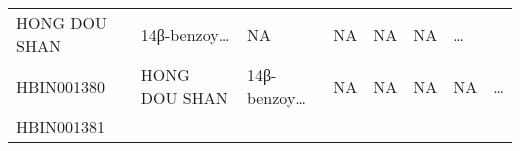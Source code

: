 \documentclass[
]{article}
\begin{document}
\begin{longtable}[]{@{}llllllll@{}}
\begin{minipage}[t]{0.11\columnwidth}
HONG DOU SHAN\strut
\end{minipage} & \begin{minipage}[t]{0.14\columnwidth}\raggedright
14β-benzoy\ldots{}\strut
\end{minipage} & \begin{minipage}[t]{0.14\columnwidth}\raggedright
NA\strut
\end{minipage} & \begin{minipage}[t]{0.08\columnwidth}\raggedright
NA\strut
\end{minipage} & \begin{minipage}[t]{0.09\columnwidth}\raggedright
NA\strut
\end{minipage} & \begin{minipage}[t]{0.11\columnwidth}\raggedright
NA\strut
\end{minipage} & \begin{minipage}[t]{0.03\columnwidth}\raggedright
\ldots{}\strut
\end{minipage}\tabularnewline
\begin{minipage}[t]{0.11\columnwidth}\raggedright
HBIN001380\strut
\end{minipage} & \begin{minipage}[t]{0.11\columnwidth}\raggedright
HONG DOU SHAN\strut
\end{minipage} & \begin{minipage}[t]{0.14\columnwidth}\raggedright
14β-benzoy\ldots{}\strut
\end{minipage} & \begin{minipage}[t]{0.14\columnwidth}\raggedright
NA\strut
\end{minipage} & \begin{minipage}[t]{0.08\columnwidth}\raggedright
NA\strut
\end{minipage} & \begin{minipage}[t]{0.09\columnwidth}\raggedright
NA\strut
\end{minipage} & \begin{minipage}[t]{0.11\columnwidth}\raggedright
NA\strut
\end{minipage} & \begin{minipage}[t]{0.03\columnwidth}\raggedright
\ldots{}\strut
\end{minipage}\tabularnewline
\begin{minipage}[t]{0.11\columnwidth}\raggedright
HBIN001381\strut
\end{minipage} & \begin{minipage}[t]{0.11\columnwidth}\raggedright

\end{minipage}
\end{longtable}
\end{document}
